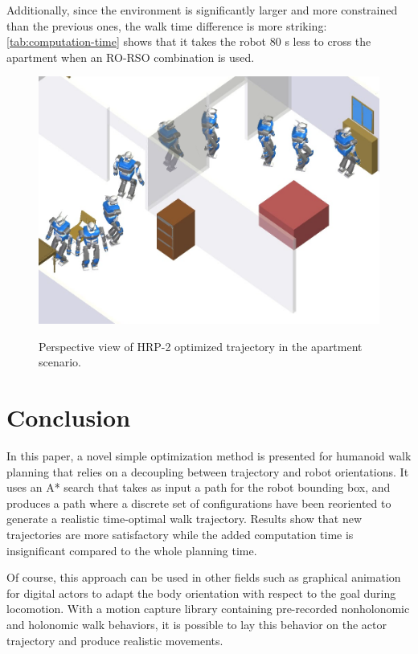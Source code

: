 Additionally, since the environment is significantly larger and more
constrained than the previous ones, the walk time difference is more
striking: \autoref{tab:computation-time} shows that it takes the robot
80 s less to cross the apartment when an RO-RSO combination is used.

\begin{figure}
  \centering
      {\includegraphics[width = \linewidth]{src/chap1-path-optimization/apartment-hash-optim-perspective-hrp2.png}}
      \caption{Perspective view of HRP-2 optimized trajectory in the
        apartment scenario.}
      \label{fig:apartment-hash-optim-perspective-hrp2}
\end{figure}

\section{Conclusion}
\noindent In this paper, a novel simple optimization method is
presented for humanoid walk planning that relies on a decoupling
between trajectory and robot orientations. It uses an A* search that
takes as input a path for the robot bounding box, and produces a path
where a discrete set of configurations have been reoriented to generate
a realistic time-optimal walk trajectory. Results show that new
trajectories are more satisfactory while the added computation time is
insignificant compared to the whole planning time.

Of course, this approach can be used in other fields such as graphical
animation for digital actors to adapt the body orientation with respect
to the goal during locomotion. With a motion capture library
containing pre-recorded nonholonomic and holonomic walk behaviors, it
is possible to lay this behavior on the actor trajectory and produce
realistic movements.

